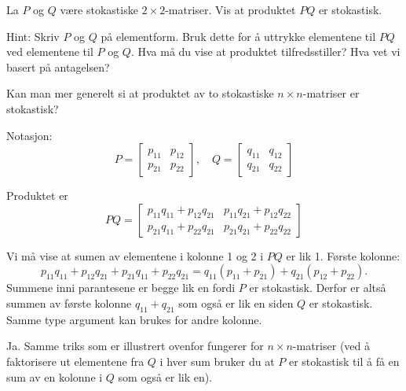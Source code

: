 \begin{oppgave}
\begin{punkt}
La $P$ og $Q$ være stokastiske $2\times 2$-matriser. Vis at produktet $PQ$ er stokastisk.

\noindent
Hint: Skriv $P$ og $Q$ på elementform. Bruk dette for å uttrykke elementene til $PQ$ ved elementene til $P$ og $Q$. Hva må du vise at produktet tilfredsstiller? Hva vet vi basert på antagelsen?

\end{punkt}
\begin{punkt}
Kan man mer generelt si at produktet av to stokastiske $n\times n$-matriser er stokastisk?
\end{punkt}
\end{oppgave}

\begin{losning}

\begin{punkt}
Notasjon: $$P=\begin{bmatrix}
p_{11} & p_{12}\\
p_{21} & p_{22}
\end{bmatrix},\quad Q=\begin{bmatrix}
q_{11} & q_{12}\\
q_{21} & q_{22}
\end{bmatrix}$$

Produktet er $$PQ=\begin{bmatrix}
p_{11}q_{11}+p_{12}q_{21} & p_{11}q_{21}+p_{12}q_{22}\\
p_{21}q_{11}+p_{22}q_{21} & p_{21}q_{21}+p_{22}q_{22}
\end{bmatrix}$$
\end{punkt}

Vi må vise at sumen av elementene i kolonne 1 og 2 i $PQ$ er lik 1. Første kolonne: $$p_{11}q_{11}+p_{12}q_{21}+p_{21}q_{11}+p_{22}q_{21}=q_{11}(p_{11}+p_{21})+q_{21}(p_{12}+p_{22}).$$ Summene inni parantesene er begge lik en fordi $P$ er stokastisk. Derfor er altså summen av første kolonne $q_{11}+q_{21}$ som også er lik en siden $Q$ er stokastisk. Samme type argument kan brukes for andre kolonne.

\begin{punkt}
Ja. Samme triks som er illustrert ovenfor fungerer for $n\times n$-matriser (ved å faktorisere ut elementene fra $Q$ i hver sum bruker du at $P$ er stokastisk til å få en sum av en kolonne i $Q$ som også er lik en). 
\end{punkt}

\end{losning}



